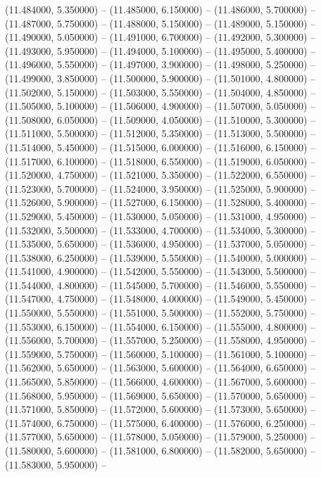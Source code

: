 (11.484000, 5.350000) -- 
(11.485000, 6.150000) -- 
(11.486000, 5.700000) -- 
(11.487000, 5.750000) -- 
(11.488000, 5.150000) -- 
(11.489000, 5.150000) -- 
(11.490000, 5.050000) -- 
(11.491000, 6.700000) -- 
(11.492000, 5.300000) -- 
(11.493000, 5.950000) -- 
(11.494000, 5.100000) -- 
(11.495000, 5.400000) -- 
(11.496000, 5.550000) -- 
(11.497000, 3.900000) -- 
(11.498000, 5.250000) -- 
(11.499000, 3.850000) -- 
(11.500000, 5.900000) -- 
(11.501000, 4.800000) -- 
(11.502000, 5.150000) -- 
(11.503000, 5.550000) -- 
(11.504000, 4.850000) -- 
(11.505000, 5.100000) -- 
(11.506000, 4.900000) -- 
(11.507000, 5.050000) -- 
(11.508000, 6.050000) -- 
(11.509000, 4.050000) -- 
(11.510000, 5.300000) -- 
(11.511000, 5.500000) -- 
(11.512000, 5.350000) -- 
(11.513000, 5.500000) -- 
(11.514000, 5.450000) -- 
(11.515000, 6.000000) -- 
(11.516000, 6.150000) -- 
(11.517000, 6.100000) -- 
(11.518000, 6.550000) -- 
(11.519000, 6.050000) -- 
(11.520000, 4.750000) -- 
(11.521000, 5.350000) -- 
(11.522000, 6.550000) -- 
(11.523000, 5.700000) -- 
(11.524000, 3.950000) -- 
(11.525000, 5.900000) -- 
(11.526000, 5.900000) -- 
(11.527000, 6.150000) -- 
(11.528000, 5.400000) -- 
(11.529000, 5.450000) -- 
(11.530000, 5.050000) -- 
(11.531000, 4.950000) -- 
(11.532000, 5.500000) -- 
(11.533000, 4.700000) -- 
(11.534000, 5.300000) -- 
(11.535000, 5.650000) -- 
(11.536000, 4.950000) -- 
(11.537000, 5.050000) -- 
(11.538000, 6.250000) -- 
(11.539000, 5.550000) -- 
(11.540000, 5.000000) -- 
(11.541000, 4.900000) -- 
(11.542000, 5.550000) -- 
(11.543000, 5.500000) -- 
(11.544000, 4.800000) -- 
(11.545000, 5.700000) -- 
(11.546000, 5.550000) -- 
(11.547000, 4.750000) -- 
(11.548000, 4.000000) -- 
(11.549000, 5.450000) -- 
(11.550000, 5.550000) -- 
(11.551000, 5.500000) -- 
(11.552000, 5.750000) -- 
(11.553000, 6.150000) -- 
(11.554000, 6.150000) -- 
(11.555000, 4.800000) -- 
(11.556000, 5.700000) -- 
(11.557000, 5.250000) -- 
(11.558000, 4.950000) -- 
(11.559000, 5.750000) -- 
(11.560000, 5.100000) -- 
(11.561000, 5.100000) -- 
(11.562000, 5.650000) -- 
(11.563000, 5.600000) -- 
(11.564000, 6.650000) -- 
(11.565000, 5.850000) -- 
(11.566000, 4.600000) -- 
(11.567000, 5.600000) -- 
(11.568000, 5.950000) -- 
(11.569000, 5.650000) -- 
(11.570000, 5.650000) -- 
(11.571000, 5.850000) -- 
(11.572000, 5.600000) -- 
(11.573000, 5.650000) -- 
(11.574000, 6.750000) -- 
(11.575000, 6.400000) -- 
(11.576000, 6.250000) -- 
(11.577000, 5.650000) -- 
(11.578000, 5.050000) -- 
(11.579000, 5.250000) -- 
(11.580000, 5.600000) -- 
(11.581000, 6.800000) -- 
(11.582000, 5.650000) -- 
(11.583000, 5.950000) -- 
